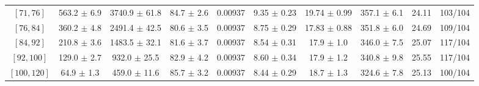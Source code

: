 \begin{tabular}{c||c|c|c|c|c|c|c||c|c}
$[71, 76]$ & 563.2 $\pm$ 6.9 & 3740.9 $\pm$ 61.8 & 84.7 $\pm$ 2.6 & 0.00937 & 9.35 $\pm$ 0.23 & 19.74 $\pm$ 0.99 & 357.1 $\pm$ 6.1 & 24.11 & 103/104\\
$[76, 84]$ & 360.2 $\pm$ 4.8 & 2491.4 $\pm$ 42.5 & 80.6 $\pm$ 3.5 & 0.00937 & 8.75 $\pm$ 0.29 & 17.83 $\pm$ 0.88 & 351.8 $\pm$ 6.0 & 24.69 & 109/104\\
$[84, 92]$ & 210.8 $\pm$ 3.6 & 1483.5 $\pm$ 32.1 & 81.6 $\pm$ 3.7 & 0.00937 & 8.54 $\pm$ 0.31 & 17.9 $\pm$ 1.0 & 346.0 $\pm$ 7.5 & 25.07 & 117/104\\
$[92, 100]$ & 129.0 $\pm$ 2.7 & 932.0 $\pm$ 25.5 & 82.9 $\pm$ 4.2 & 0.00937 & 8.60 $\pm$ 0.34 & 17.9 $\pm$ 1.2 & 340.8 $\pm$ 9.8 & 25.55 & 117/104\\
$[100, 120]$ & 64.9 $\pm$ 1.3 & 459.0 $\pm$ 11.6 & 85.7 $\pm$ 3.2 & 0.00937 & 8.44 $\pm$ 0.29 & 18.7 $\pm$ 1.3 & 324.6 $\pm$ 7.8 & 25.13 & 100/104\\
\end{tabular}
